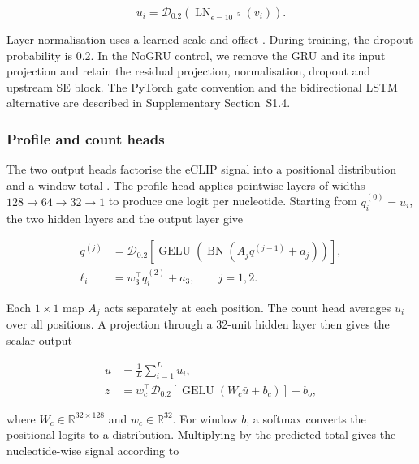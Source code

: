 \documentclass[webpdf,contemporary,large]{current_assets/oup-authoring-template}
\newcommand{\supsect}[1]{Supplementary Section~#1}
\begin{document}
\begin{equation}
u_i=\mathcal D_{0.2}\!\left(\operatorname{LN}_{\epsilon=10^{-5}}(v_i)\right).
\label{eq:recurrent_residual}
\end{equation}

Layer normalisation uses a learned scale and offset \citep{ba2016layernorm}. During training, the dropout probability is 0.2. In the NoGRU control, we remove the GRU and its input projection and retain the residual projection, normalisation, dropout and upstream SE block. The PyTorch gate convention and the bidirectional LSTM alternative are described in \supsect{S1.4}.

\subsubsection{Profile and count heads}

The two output heads factorise the eCLIP signal into a positional distribution and a window total \citep{avsec2021bpnet}. The profile head applies pointwise layers of widths $128\rightarrow64\rightarrow32\rightarrow1$ to produce one logit per nucleotide. Starting from $q_i^{(0)}=u_i$, the two hidden layers and the output layer give

\begin{equation}
\begin{aligned}
q^{(j)}&=\mathcal D_{0.2}\!\left[
\operatorname{GELU}\!\left(\operatorname{BN}(A_jq^{(j-1)}+a_j)\right)\right],\\
\ell_i&=w_3^\top q_i^{(2)}+a_3,\qquad j=1,2.
\end{aligned}
\label{eq:profile_head}
\end{equation}

Each $1\times1$ map $A_j$ acts separately at each position. The count head averages $u_i$ over all positions. A projection through a 32-unit hidden layer then gives the scalar output

\begin{equation}
\begin{aligned}
\bar u&=\frac1L\sum_{i=1}^{L}u_i,\\
z&=w_c^\top\mathcal D_{0.2}\!\left[
\operatorname{GELU}(W_c\bar u+b_c)\right]+b_o,
\end{aligned}
\label{eq:count_head}
\end{equation}

where $W_c\in\mathbb R^{32\times128}$ and $w_c\in\mathbb R^{32}$. For window $b$, a softmax converts the positional logits to a distribution. Multiplying by the predicted total gives the nucleotide-wise signal according to
\end{document}

